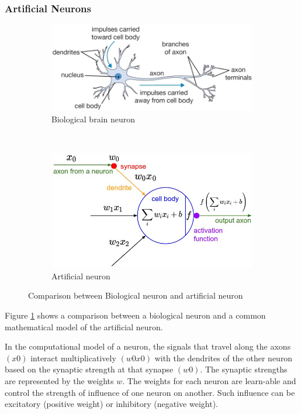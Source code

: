 \subsubsection{Artificial Neurons}
\begin{figure}[ht!]
\centering
\begin{subfigure}[t]{0.5\textwidth}
\centering
\includegraphics[width=\linewidth]{Figures/neuron.png}
\caption{Biological brain neuron}
\end{subfigure}%
~ 
\begin{subfigure}[t]{0.5\textwidth}
\centering
\includegraphics[width=\linewidth]{Figures/neuron_model.jpeg}
\caption{Artificial neuron}
\end{subfigure}
\caption{Comparison between Biological neuron and artificial neuron}
\label{neurons}
\end{figure}
Figure \ref{neurons} shows a comparison between a biological neuron and a common mathematical model of the artificial neuron. 

In the computational model of a neuron, the signals that travel along the axons \((x0)\) interact multiplicatively \((w0x0)\) with the dendrites of the other neuron based on the synaptic strength at that synapse \((w0)\). The synaptic strengths are represented by the weights \(w\). The weights for each neuron are learn-able and control the strength of influence of one neuron on another. Such influence can be excitatory (positive weight) or inhibitory (negative weight). 
